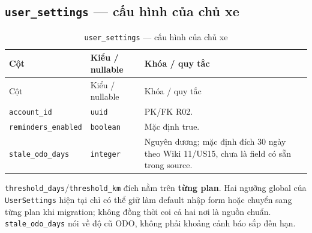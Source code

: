 \subsection{\texttt{user\_\allowbreak{}settings} — cấu hình của chủ xe}
\begin{smalltable}\begin{longtable}{L{3.0cm}L{3.2cm}L{8.2cm}}
\caption{\texttt{user\_\allowbreak{}settings} — cấu hình của chủ xe}\label{tab:dictionary-4}\\\toprule
Cột & Kiểu / nullable & Khóa / quy tắc\\\midrule\endfirsthead
\toprule Cột & Kiểu / nullable & Khóa / quy tắc\\\midrule\endhead
\texttt{account\_\allowbreak{}id} & \texttt{uuid} & PK/FK R02.\\
\texttt{reminders\_\allowbreak{}enabled} & \texttt{boolean} & Mặc định true.\\
\texttt{stale\_\allowbreak{}odo\_\allowbreak{}days} & \texttt{integer} & Nguyên dương; mặc định đích 30 ngày theo Wiki 11/US15, chưa là field có sẵn trong source.\\
\bottomrule\end{longtable}\end{smalltable}
\texttt{threshold\_\allowbreak{}days}/\texttt{threshold\_\allowbreak{}km} đích nằm trên \textbf{từng plan}. Hai ngưỡng global của \texttt{UserSettings} hiện tại chỉ có thể giữ làm default nhập form hoặc chuyển sang từng plan khi migration; không đồng thời coi cả hai nơi là nguồn chuẩn. \texttt{stale\_\allowbreak{}odo\_\allowbreak{}days} nói về độ cũ ODO, không phải khoảng cảnh báo sắp đến hạn.\par
